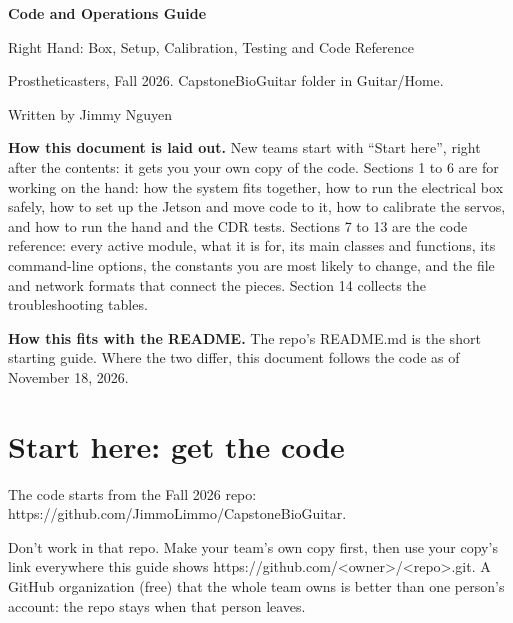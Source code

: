 \documentclass[11pt,letterpaper]{article}
\newcommand{\code}[1]{\textcolor{codeblue}{\ttfamily\smaller\relax #1}}
\begin{document}
\RaggedRight
\setlength{\emergencystretch}{3em}
\setlength{\parindent}{0pt}

\thispagestyle{fancy}
\vspace*{1.1in}
{\color{hone}\bfseries\fontsize{26}{31}\selectfont Code and Operations Guide\par}
\vspace{6pt}
{\color{htwo}\fontsize{18}{22}\selectfont Right Hand: Box, Setup, Calibration, Testing and Code Reference\par}
\vspace{24pt}
Prostheticasters, Fall 2026. \code{CapstoneBioGuitar folder in Guitar/Home}.

Written by Jimmy Nguyen

\vspace{18pt}
\textbf{How this document is laid out.} New teams start with ``Start here'', right after the contents: it gets you your own copy of the code. Sections 1 to 6 are for working on the hand: how the system fits together, how to run the electrical box safely, how to set up the Jetson and move code to it, how to calibrate the servos, and how to run the hand and the CDR tests. Sections 7 to 13 are the code reference: every active module, what it is for, its main classes and functions, its command-line options, the constants you are most likely to change, and the file and network formats that connect the pieces. Section 14 collects the troubleshooting tables.

\textbf{How this fits with the README.} The repo's \code{README.md} is the short starting guide. Where the two differ, this document follows the code as of November 18, 2026.
\newpage

\tableofcontents
\newpage

\section*{Start here: get the code}
The code starts from the Fall 2026 repo: \code{https:/\allowbreak{}/\allowbreak{}github.com/\allowbreak{}JimmoLimmo/\allowbreak{}CapstoneBioGuitar}.

Don't work in that repo. Make your team's own copy first, then use your copy's link everywhere this guide shows \code{https:/\allowbreak{}/\allowbreak{}github.com/\allowbreak{}<owner>/\allowbreak{}<repo>.git}. A GitHub organization (free) that the whole team owns is better than one person's account: the repo stays when that person leaves.
\end{document}
